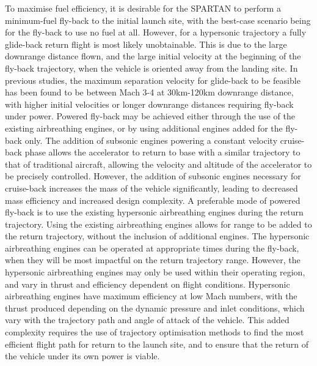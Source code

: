 \documentclass[journal]{new-aiaa} %
\begin{document}
To maximise fuel efficiency, it is desirable for the SPARTAN to perform a minimum-fuel fly-back to the initial launch site, with the best-case scenario being for the fly-back to use no fuel at all.
 However, for a hypersonic trajectory a fully glide-back return flight is most likely unobtainable. This is due to the large downrange distance flown, and the large initial velocity at the beginning of the fly-back trajectory, when the vehicle is oriented away from the landing site.
In previous studies, the maximum separation velocity for glide-back to be feasible has been found to be between Mach 3-4 at 30km-120km downrange distance, with higher initial velocities or longer downrange distances requiring fly-back under power\cite{Hellman,Tetlow1992}.
Powered fly-back may be achieved either through the use of the existing airbreathing engines, or by using additional engines added for the fly-back only\cite{Mehta2001,Tetlow1992,Hellman,Wilhite1991}. 
The addition of subsonic engines powering a constant velocity cruise-back phase allows the accelerator to return to base with a similar trajectory to that of traditional aircraft, allowing the velocity and altitude of the accelerator to be precisely controlled. However, the addition of subsonic engines necessary for cruise-back increases the mass of the vehicle significantly, leading to decreased mass efficiency and increased design complexity\cite{Hellman}. 
A preferable mode of powered fly-back is to use the existing hypersonic airbreathing engines during the return trajectory. Using the existing airbreathing engines allows for range to be added to the return trajectory, without the inclusion of additional engines. The hypersonic airbreathing engines can be operated at appropriate times during the fly-back, when they will be most impactful on the return trajectory range. However, the hypersonic airbreathing engines may only be used within their operating region, and vary in thrust and efficiency dependent on flight conditions. Hypersonic airbreathing engines have maximum efficiency at low Mach numbers\cite{Preller2017}, with the thrust produced depending on the dynamic pressure and inlet conditions, which vary with the trajectory path and angle of attack of the vehicle. This added complexity requires the use of trajectory optimisation methods to find the most efficient flight path for return to the launch site, and to ensure that the return of the vehicle under its own power is viable. 
\end{document}
